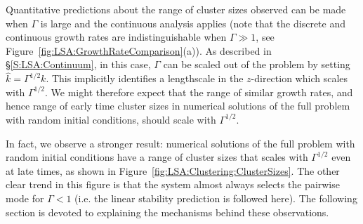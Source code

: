 Quantitative predictions about the range of cluster sizes observed can be made when $\Gamma$ is large and the continuous analysis applies (note that the discrete and continuous growth rates are indistinguishable when $\Gamma \gg 1$, see Figure~\ref{fig:LSA:GrowthRateComparison}(a)). As described in \S\ref{S:LSA:Continuum}, in this case, $\Gamma$ can be scaled out of the problem by setting $\hat{k} = \Gamma^{1/2}k$. This implicitly identifies a lengthscale in the $z$-direction which scales with $\Gamma^{1/2}$. We might therefore expect that the range of similar growth rates, and hence range of early time cluster sizes in numerical solutions of the full problem with random initial conditions, should scale with $\Gamma^{1/2}$.

In fact, we observe a stronger result: numerical solutions of the full problem with random initial conditions have a range of cluster sizes that scales with $\Gamma^{1/2}$ even at late times, as shown in Figure~\ref{fig:LSA:Clustering:ClusterSizes}. The other clear trend in this figure is that the system almost always selects the pairwise mode for $\Gamma < 1$ (i.e. the linear stability prediction is followed here). The following section is devoted to explaining the mechanisms behind these observations.

